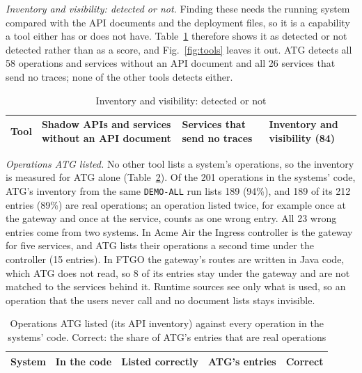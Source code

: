 \textit{Inventory and visibility: detected or not.} Finding these needs the running system compared with the API documents and the deployment files, so it is a capability a tool either has or does not have. Table~\ref{tab:inventory} therefore shows it as detected or not detected rather than as a score, and Fig.~\ref{fig:tools} leaves it out. ATG detects all 58 operations and services without an API document and all 26 services that send no traces; none of the other tools detects either.

\begin{table}[!htbp]
\caption{Inventory and visibility: detected or not}
\label{tab:inventory}
\centering
\scriptsize
\setlength{\tabcolsep}{3pt}
\begin{tabular}{@{}l>{\raggedright\arraybackslash}p{2.3cm}>{\raggedright\arraybackslash}p{1.8cm}>{\raggedright\arraybackslash}p{2.0cm}@{}}
\toprule
Tool & Shadow APIs and services without an API document & Services that send no traces & Inventory and visibility (84) \\
\midrule
\bottomrule
\end{tabular}
\end{table}

\textit{Operations ATG listed.} No other tool lists a system's operations, so the inventory is measured for ATG alone (Table~\ref{tab:ops}). Of the 201 operations in the systems' code, ATG's inventory from the same \texttt{DEMO-ALL} run lists 189 (94\%), and 189 of its 212 entries (89\%) are real operations; an operation listed twice, for example once at the gateway and once at the service, counts as one wrong entry. All 23 wrong entries come from two systems. In Acme Air the Ingress controller is the gateway for five services, and ATG lists their operations a second time under the controller (15 entries). In FTGO the gateway's routes are written in Java code, which ATG does not read, so 8 of its entries stay under the gateway and are not matched to the services behind it. Runtime sources see only what is used, so an operation that the users never call and no document lists stays invisible.

\begin{table}[!htbp]
\caption{Operations ATG listed (its API inventory) against every operation in the systems' code. Correct: the share of ATG's entries that are real operations}
\label{tab:ops}
\centering
\footnotesize
\setlength{\tabcolsep}{3pt}
\begin{tabular}{@{}lrrrr@{}}
\toprule
System & In the code & Listed correctly & ATG's entries & Correct \\
\midrule
\bottomrule
\end{tabular}
\end{table}

